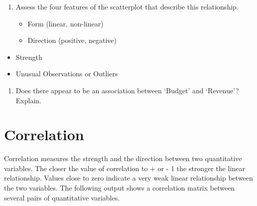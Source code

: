 \documentclass[
]{report}
\providecommand{\tightlist}{%
  \setlength{\itemsep}{0pt}\setlength{\parskip}{0pt}}
\begin{document}
\begin{enumerate}
\def\labelenumi{\arabic{enumi}.}
\setcounter{enumi}{2}
\item
  Assess the four features of the scatterplot that describe this relationship.

  \begin{itemize}
  \tightlist
  \item
    Form (linear, non-linear)
    \vspace{1in}
  \item
    Direction (positive, negative)
  \end{itemize}
\end{enumerate}

\vspace{1in}

\begin{itemize}
\tightlist
\item
  Strength
\end{itemize}

\vspace{1in}

\begin{itemize}
\tightlist
\item
  Unusual Observations or Outliers
\end{itemize}

\vspace{1in}

\begin{enumerate}
\def\labelenumi{\arabic{enumi}.}
\setcounter{enumi}{3}
\tightlist
\item
  Does there appear to be an association between `Budget' and `Revenue'? Explain.
\end{enumerate}

\vspace{1in}

\hypertarget{correlation}{%
\section{Correlation}\label{correlation}}

Correlation measures the strength and the direction between two quantitative variables. The closer the value of correlation to + or - 1 the stronger the linear relationship. Values close to zero indicate a very weak linear relationship between the two variables. The following output shows a correlation matrix between several pairs of quantitative variables.
\end{document}
